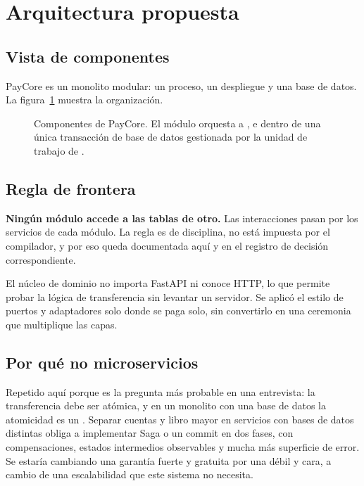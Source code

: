 \section{Arquitectura propuesta}
\label{sec:arquitectura}

\subsection{Vista de componentes}

PayCore es un monolito modular: un proceso, un despliegue y una base de datos.
La figura~\ref{fig:arquitectura} muestra la organización.

\begin{figure}[htbp]
\centering
\resizebox{0.95\textwidth}{!}{}
\caption{Componentes de PayCore. El módulo  orquesta a
,  e  dentro de una única
transacción de base de datos gestionada por la unidad de trabajo de
.}
\label{fig:arquitectura}
\end{figure}

\subsection{Regla de frontera}

\textbf{Ningún módulo accede a las tablas de otro.} Las interacciones pasan
por los servicios de cada módulo. La regla es de disciplina, no está impuesta
por el compilador, y por eso queda documentada aquí y en el registro de
decisión correspondiente. 

El núcleo de dominio no importa FastAPI ni conoce HTTP, lo que permite probar
la lógica de transferencia sin levantar un servidor. Se aplicó el estilo de
puertos y adaptadores solo donde se paga solo, sin convertirlo en una
ceremonia que multiplique las capas.

\subsection{Por qué no microservicios}

Repetido aquí porque es la pregunta más probable en una entrevista: la
transferencia debe ser atómica, y en un monolito con una base de datos la
atomicidad es un . Separar cuentas y libro mayor en servicios
con bases de datos distintas obliga a implementar Saga o un commit en dos
fases, con compensaciones, estados intermedios observables y mucha más
superficie de error. Se estaría cambiando una garantía fuerte y gratuita por
una débil y cara, a cambio de una escalabilidad que este sistema no necesita.

